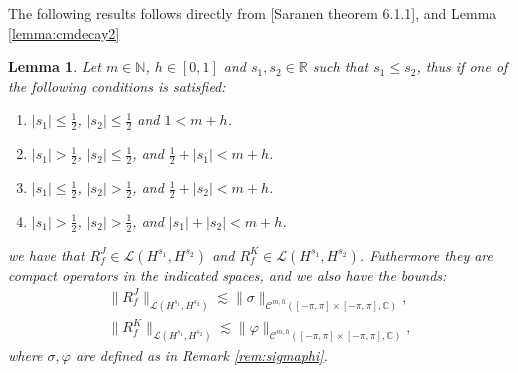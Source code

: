 \documentclass{article}
\newtheorem{lemma}[theorem]{Lemma}
\newcommand{\todo}[1]{{\color{red}[#1]}}
\newcommand{\IC}{{\mathbb C}}
\newcommand{\IN}{{\mathbb N}}
\newcommand{\IR}{{\mathbb R}}
\newcommand{\cmspaceh}[4]{\mathcal{C}^{#1,#2} \left( #3, #4 \right)}
\begin{document}
The following results follows directly from \todo{Saranen theorem 6.1.1}, and Lemma \ref{lemma:cmdecay2}
\begin{lemma}
\label{lemma:rfper}
Let $m \in \IN$, $h \in [0,1]$ and $s_1, s_2 \in \IR$ such that $s_1 \leq s_2$, thus if one of the following conditions is satisfied: 
\begin{enumerate}
\item $|s_1| \leq \frac{1}{2}$, $|s_2| \leq \frac{1}{2}$ and $1 < m+h$.
\item 
$|s_1| > \frac{1}{2}$, $|s_2| \leq \frac{1}{2}$, and  $\frac{1}{2}+|s_1| < m+h$.
\item 
$|s_1| \leq \frac{1}{2}$, $|s_2|>\frac{1}{2}$, and $\frac{1}{2}+|s_2| < m+h$.
\item 
$|s_1| > \frac{1}{2}$, $|s_2|>\frac{1}{2}$, and $|s_1|+|s_2| < m+h$.
\end{enumerate}
we have that $ R_f^J  \in \mathcal{L}(H^{s_1},H^{s_2})$ and  $R^K_f  \in \mathcal{L}(H^{s_1},H^{s_2})$. Futhermore they are compact operators in the indicated spaces, and we also have the bounds: 
\begin{align*}
\| R_f^J\|_{ \mathcal{L}(H^{s_1},H^{s_2})} \lesssim \|\sigma\|_{\cmspaceh{m}{h}{[-\pi,\pi]\times[-\pi,\pi]}{\IC}},\\
\| R_f^K\|_{ \mathcal{L}(H^{s_1},H^{s_2})} \lesssim \|\varphi\|_{\cmspaceh{m}{h}{[-\pi,\pi]\times[-\pi,\pi]}{\IC}},
\end{align*}
where $\sigma, \varphi$ are defined as in Remark \ref{rem:sigmaphi}.
\end{lemma}
\end{document}

